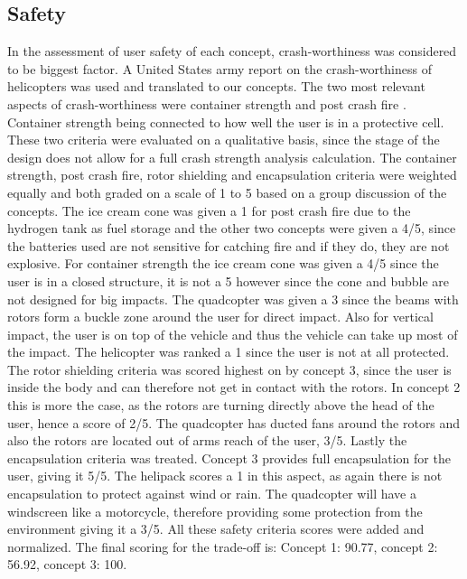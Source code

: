 \subsection{Safety}
In the assessment of user safety of each concept, crash-worthiness was considered to be biggest factor. A United States army report on the crash-worthiness of helicopters was used  and translated to our concepts. The two most relevant aspects of crash-worthiness were container strength and post crash fire . Container strength being connected to how well the user is in a protective cell. These two criteria were evaluated on a qualitative basis, since the stage of the design does not allow for a full crash strength analysis calculation. The container strength, post crash fire, rotor shielding and encapsulation criteria were weighted equally and both graded on a scale of 1 to 5 based on a group discussion of the concepts. The ice cream cone was given a 1 for post crash fire due to the hydrogen tank as fuel storage and the other two concepts were given a 4/5, since the batteries used are not sensitive for catching fire and if they do, they are not explosive. For container strength the ice cream cone was given a 4/5 since the user is in a closed structure, it is not a 5 however since the cone and bubble are not designed for big impacts. The quadcopter was given a 3 since the beams with rotors form a buckle zone around the user for direct impact. Also for vertical impact, the user is on top of the vehicle and thus the vehicle can take up most of the impact. The helicopter was ranked a 1 since the user is not at all protected. The rotor shielding criteria was scored highest on by concept 3, since the user is inside the body and can therefore not get in contact with the rotors. In concept 2 this is more the case, as the rotors are turning directly above the head of the user, hence a score of 2/5. The quadcopter has ducted fans around the rotors and also the rotors are located out of arms reach of the user, 3/5. Lastly the encapsulation criteria was treated. Concept 3 provides full encapsulation for the user, giving it 5/5. The helipack scores a 1 in this aspect, as again there is not encapsulation to protect against wind or rain. The quadcopter will have a windscreen like a motorcycle, therefore providing some protection from the environment giving it a 3/5. 
All these safety criteria scores were added and normalized. The final scoring for the trade-off is: Concept 1: 90.77, concept 2: 56.92, concept 3: 100. 


